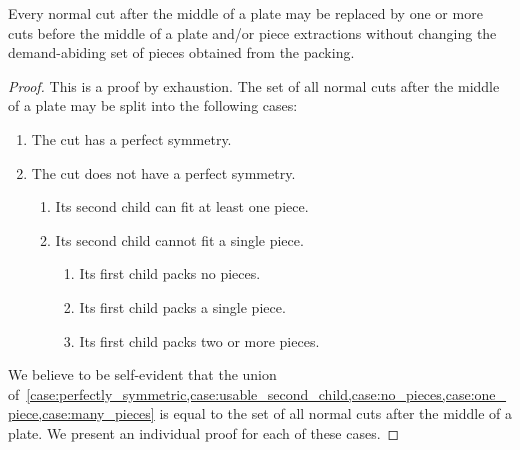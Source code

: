 \begin{theorem}
Every normal cut after the middle of a plate may be replaced by one or more cuts before the middle of a plate and/or piece extractions without changing the demand-abiding set of pieces obtained from the packing.
\end{theorem}

\begin{proof}
This is a proof by exhaustion. The set of all normal cuts after the middle of a plate may be split into the following cases:
\begin{enumerate}
  \item The cut has a perfect symmetry. \label{case:perfectly_symmetric}
  \item The cut does not have a perfect symmetry.
  \begin{enumerate}
    \item Its second child can fit at least one piece. \label{case:usable_second_child}
    \item Its second child cannot fit a single piece.
    \begin{enumerate}
      \item Its first child packs no pieces. \label{case:no_pieces}
      \item Its first child packs a single piece. \label{case:one_piece} %
      \item Its first child packs two or more pieces. \label{case:many_pieces}
    \end{enumerate}
  \end{enumerate}
\end{enumerate}

We believe to be self-evident that the union of~\cref{case:perfectly_symmetric,case:usable_second_child,case:no_pieces,case:one_piece,case:many_pieces} is equal to the set of all normal cuts after the middle of a plate. We present an individual proof for each of these cases.


\end{proof}
